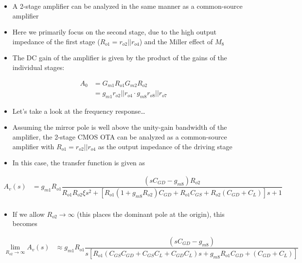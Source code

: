 \documentclass[11pt]{article}
\providecommand{\tightlist}{%
      \setlength{\itemsep}{0pt}\setlength{\parskip}{0pt}}
\begin{document}
    \begin{itemize}
\item
  A 2-stage amplifier can be analyzed in the same manner as a
  common-source amplifier
\item
  Here we primarily focus on the second stage, due to the high output
  impedance of the first stage (\(R_{o1} = r_{o2}||r_{o4}\)) and the
  Miller effect of \(M_8\)
\item
  The DC gain of the amplifier is given by the product of the gains of
  the individual stages:
\end{itemize}

\begin{align}
A_0 &= G_{m1}R_{o1}G_{m2}R_{o2}\\
&= g_{m1}r_{o2}||r_{o4}\cdot g_{m8}r_{o8}||r_{o7}
\end{align}

\begin{itemize}
\tightlist
\item
  Let's take a look at the frequency response\ldots{}
\end{itemize}

    \begin{itemize}
\tightlist
\item
  Assuming the mirror pole is well above the unity-gain bandwidth of the
  amplifier, the 2-stage CMOS OTA can be analyzed as a common-source
  amplifier with \(R_{o1} = r_{o2}||r_{o4}\) as the output impedance of
  the driving stage
\item
  In this case, the transfer function is given as
\end{itemize}

\begin{align}
A_v(s) &= g_{m1}R_{o1}\dfrac{(sC_{GD} - g_{m8})R_{o2}}{R_{o1} R_{o2}\xi s^2 + [R_{o1}(1+g_{m8}R_{o2})C_{GD} + R_{o1} C_{GS}+R_{o2}(C_{GD} + C_L)]s+1} \\
\end{align}

\begin{itemize}
\tightlist
\item
  If we allow \(R_{o2} \rightarrow \infty\) (this places the dominant
  pole at the origin), this becomes
\end{itemize}

\begin{align}
\lim_{R_{o2} \rightarrow \infty}{A_v(s)} &\approx g_{m1}R_{o1}\dfrac{(sC_{GD} - g_{m8})}{s[R_{o1}(C_{GS}C_{GD}+C_{GS}C_L+C_{GD}C_L)s + g_{m8}R_{o1}C_{GD} + (C_{GD} + C_L)]}\\
\end{align}
\end{document}
